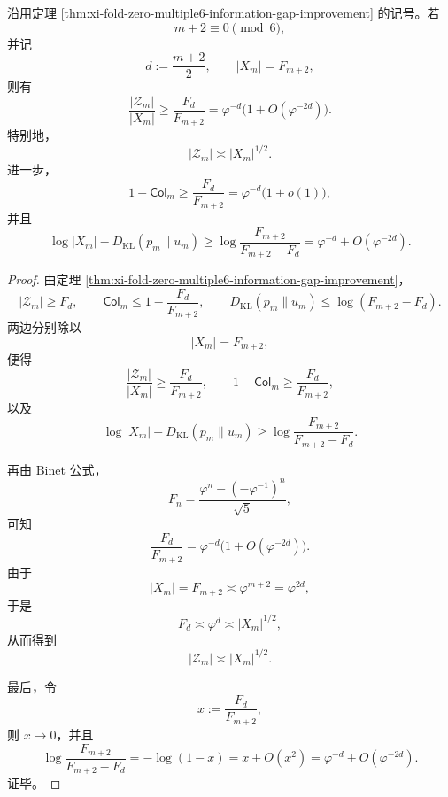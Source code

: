 \begin{theorem}\label{thm:xi-time-part60ab-window6-zero-block-halfscale-information-improvement}
沿用定理 \ref{thm:xi-fold-zero-multiple6-information-gap-improvement} 的记号。若
\[
m+2\equiv 0\pmod 6,
\]
并记
\[
d:=\frac{m+2}{2},
\qquad
|X_m|=F_{m+2},
\]
则有
\[
\frac{|\mathcal Z_m|}{|X_m|}
\ge
\frac{F_d}{F_{m+2}}
=
\varphi^{-d}\bigl(1+O(\varphi^{-2d})\bigr).
\]
特别地，
\[
|\mathcal Z_m|\asymp |X_m|^{1/2}.
\]
进一步，
\[
1-\mathsf{Col}_m\ge \frac{F_d}{F_{m+2}}
=
\varphi^{-d}\bigl(1+o(1)\bigr),
\]
并且
\[
\log|X_m|-D_{\mathrm{KL}}(p_m\|u_m)
\ge
\log\frac{F_{m+2}}{F_{m+2}-F_d}
=
\varphi^{-d}+O(\varphi^{-2d}).
\]
\end{theorem}
\begin{proof}
由定理 \ref{thm:xi-fold-zero-multiple6-information-gap-improvement}，
\[
|\mathcal Z_m|\ge F_d,
\qquad
\mathsf{Col}_m\le 1-\frac{F_d}{F_{m+2}},
\qquad
D_{\mathrm{KL}}(p_m\|u_m)\le \log(F_{m+2}-F_d).
\]
两边分别除以
\[
|X_m|=F_{m+2},
\]
便得
\[
\frac{|\mathcal Z_m|}{|X_m|}\ge \frac{F_d}{F_{m+2}},
\qquad
1-\mathsf{Col}_m\ge \frac{F_d}{F_{m+2}},
\]
以及
\[
\log|X_m|-D_{\mathrm{KL}}(p_m\|u_m)
\ge
\log\frac{F_{m+2}}{F_{m+2}-F_d}.
\]

再由 Binet 公式，
\[
F_n=\frac{\varphi^n-(-\varphi^{-1})^n}{\sqrt5},
\]
可知
\[
\frac{F_d}{F_{m+2}}
=
\varphi^{-d}\bigl(1+O(\varphi^{-2d})\bigr).
\]
由于
\[
|X_m|=F_{m+2}\asymp \varphi^{m+2}=\varphi^{2d},
\]
于是
\[
F_d\asymp \varphi^d\asymp |X_m|^{1/2},
\]
从而得到
\[
|\mathcal Z_m|\asymp |X_m|^{1/2}.
\]

最后，令
\[
x:=\frac{F_d}{F_{m+2}},
\]
则 \(x\to 0\)，并且
\[
\log\frac{F_{m+2}}{F_{m+2}-F_d}
=
-\log(1-x)
=
x+O(x^2)
=
\varphi^{-d}+O(\varphi^{-2d}).
\]
证毕。
\end{proof}

